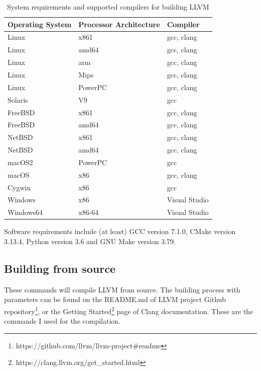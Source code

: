 \begin{table}[H]
	\centering
	\begin{tabular}{ | m{} | m{} | m{} | }
		\hline
		\textbf{Operating System} & \textbf{Processor Architecture} & \textbf{Compiler} \\
		\hline \hline
		Linux & x861 & gcc, clang \\
		\hline
		Linux & amd64 & gcc, clang \\
		\hline
		Linux & arm & gcc, clang \\
		\hline
		Linux & Mips & gcc, clang \\
		\hline
		Linux & PowerPC & gcc, clang \\
		\hline
		Solaris & V9 & gcc \\
		\hline
		FreeBSD & x861 & gcc, clang \\
		\hline
		FreeBSD & amd64 & gcc, clang \\
		\hline
		NetBSD & x861 & gcc, clang \\
		\hline
		NetBSD & amd64 & gcc, clang \\
		\hline
		macOS2 & PowerPC & gcc \\
		\hline
		macOS & x86 & gcc, clang \\
		\hline
		Cygwin & x86 & gcc \\
		\hline
		Windows & x86 & Visual Studio \\
		\hline
		Windows64 & x86-64 & Visual Studio \\
		\hline
	\end{tabular}
	\caption{System requirements and supported compilers for building LLVM}
	\label{tab:example-1}
\end{table}

Software requirements include (at least) GCC version 7.1.0, CMake version 3.13.4, Python version 3.6 and GNU Make version 3.79.

\subsection{Building from source}

These commands will compile LLVM from source. The building process with parameters can be found on the README.md of
LLVM project Github repository\footnote{https://github.com/llvm/llvm-project\#readme}, or the Getting
Started\footnote{https://clang.llvm.org/get_started.html} page of Clang documentation. These are the commands I used for
the compilation.

